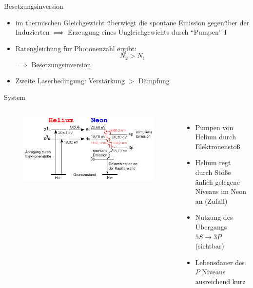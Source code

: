 \documentclass[10pt, aspectratio=169]{beamer}
\newcommand{\hne}{\ce{HeNe}}
\begin{document}
\begin{frame}{Besetzungsinversion}
  \begin{itemize}
  \item<1-> im thermischen Gleichgewicht \"uberwiegt die spontane
    Emission gegen\"uber der Induzierten \(\implies\) Erzeugung eines
    Ungleichgewichts durch ``Pumpen'' I
  \item<2-> Ratengleichung f\"ur Photonenzahl ergibt:
    \begin{equation}
      \label{eq:firstlaser}\tag{Erste Laserbedingung}
      N_2>N_1
    \end{equation}
    \(\implies\) Besetzungsinversion
  \item<3-> Zweite Laserbedingung: Verst\"arkung \(>\) D\"ampfung

  \end{itemize}
\end{frame}

\begin{frame}{\hne{} System}
  \begin{columns}
    \begin{figure}[H]
      \includegraphics[width=1\columnwidth]{heneniv.png}
    \end{figure}
    \begin{itemize}
    \item<1-> Pumpen von Helium durch Elektronensto\ss{}
    \item<2-> Helium regt durch St\"o\ss{}e \"anlich gelegene Niveaus
      im Neon an (Zufall)
    \item<3-> Nutzung des \"Ubergangs \(5S\rightarrow 3P\) (sichtbar)
    \item<4-> Lebensdauer des \(P\) Niveaus ausreichend kurz
    \end{itemize}
  \end{columns}
\end{frame}
\end{document}
